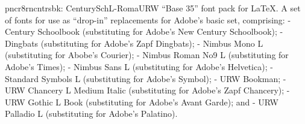 \documentclass{ddltxtyp}
\begin{document}
\begin{package}{pncr8r}{ncntrsbk: CenturySchL-Roma}{URW ``Base 35'' font pack for {\LaTeX}.}
A set of fonts for use as ``drop-in'' replacements for Adobe's
basic set, comprising: - Century Schoolbook (substituting for
Adobe's New Century Schoolbook); - Dingbats (substituting for
Adobe's Zapf Dingbats); - Nimbus Mono L (substituting for
Abobe's Courier); - Nimbus Roman No9 L (substituting for
Adobe's Times); - Nimbus Sans L (substituting for Adobe's
Helvetica); - Standard Symbols L (substituting for Adobe's
Symbol); - URW Bookman; - URW Chancery L Medium Italic
(substituting for Adobe's Zapf Chancery); - URW Gothic L Book
(substituting for Adobe's Avant Garde); and - URW Palladio L
(substituting for Adobe's Palatino).
\end{package}
\end{document}
